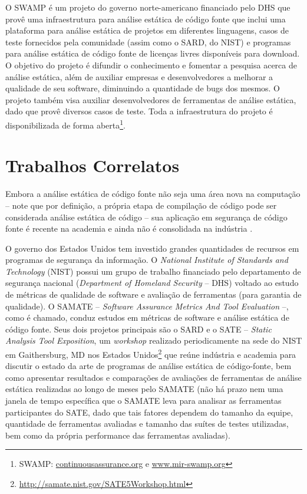   O SWAMP é um projeto do governo norte-americano financiado pelo DHS que provê uma infraestrutura para análise estática de código fonte que inclui uma plataforma para análise estática de projetos em diferentes linguagens, casos de teste fornecidos pela comunidade (assim como o SARD, do NIST) e programas para análise estática de código fonte de licenças livres disponíveis para download. O objetivo do projeto é difundir o conhecimento e fomentar a pesquisa acerca de análise estática, além de auxiliar empresas e desenvolvedores a melhorar a qualidade de seu software, diminuindo a quantidade de bugs dos mesmos. O projeto também visa auxiliar desenvolvedores de ferramentas de análise estática, dado que provê diversos casos de teste. Toda a infraestrutura do projeto é disponibilizada de forma aberta\footnote{SWAMP: \url{continuousassurance.org} e \url{www.mir-swamp.org}}.                   

  \section{Trabalhos Correlatos}

  Embora a análise estática de código fonte não seja uma  área nova na computação – note que por definição, a própria etapa de compilação de código pode ser considerada análise estática de código – sua aplicação em segurança de código fonte é recente na academia e ainda não é consolidada na indústria \cite{johnson2013don}.

  O governo dos Estados Unidos tem investido grandes quantidades de recursos em programas de segurança da informação. O \textit{National Institute of Standards and Technology} (NIST) possui um grupo de trabalho financiado pelo departamento de segurança nacional (\textit{Department of Homeland Security} – DHS) voltado ao estudo de métricas de qualidade de software e avaliação de ferramentas (para garantia de qualidade). O SAMATE – \textit{Software Assurance Metrics And Tool Evaluation} –, como é chamado, conduz estudos em métricas de software e análise estática de código fonte. Seus dois projetos principais são o SARD e o SATE – \textit{Static Analysis Tool Exposition}, um \textit{workshop} realizado periodicamente na sede do NIST em Gaithersburg, MD nos Estados Unidos\footnote{\url{http://samate.nist.gov/SATE5Workshop.html}} que reúne indústria e academia para discutir o estado da arte de programas de análise estática de código-fonte, bem como apresentar resultados e comparações de avaliações de ferramentas de análise estática realizadas ao longo de meses pelo SAMATE (não há prazo nem uma janela de tempo específica que o SAMATE leva para analisar as ferramentas participantes do SATE, dado que tais fatores dependem do tamanho da equipe, quantidade de ferramentas avaliadas e tamanho das suítes de testes utilizadas, bem como da própria performance das ferramentas avaliadas).

